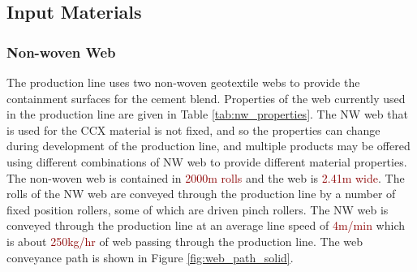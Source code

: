 \documentclass[12pt]{report}
\newcommand{\tcr}[1]{\textcolor{darkRed}{#1}}
\begin{document}
    \subsection{Input Materials}
        \subsubsection{Non-woven Web}
            The production line uses two non-woven geotextile webs to provide the containment surfaces for the cement blend. Properties of the web currently used in the production line are given in Table \ref{tab:nw_properties}. The NW web that is used for the CCX material is not fixed, and so the properties can change during development of the production line, and multiple products may be offered using different combinations of NW web to provide different material properties.
            The non-woven web is contained in \tcr{2000m rolls} and the web is \tcr{2.41m wide}. The rolls of the NW web are conveyed through the production line by a number of fixed position rollers, some of which are driven pinch rollers. The NW web is conveyed through the production line at an average line speed of \tcr{4m/min} which is about \tcr{250kg/hr} of web passing through the production line.
            The web conveyance path is shown in Figure \ref{fig:web_path_solid}.
\end{document}
